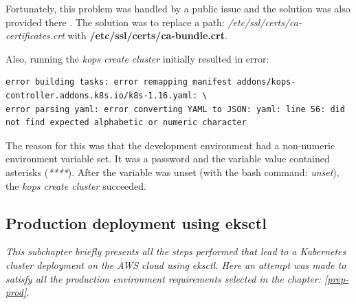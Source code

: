 Fortunately, this problem was handled by a public issue and the solution was also provided there \cite{as-github-issue}. The solution was to replace a path: \textit{/etc/ssl/certs/ca-certificates.crt} with \textbf{/etc/ssl/certs/ca-bundle.crt}.

Also, running the \textit{kops create cluster} initially resulted in error:
\begin{lstlisting}[caption={Error output of \textit{kops create cluster} command}]
error building tasks: error remapping manifest addons/kops-controller.addons.k8s.io/k8s-1.16.yaml: \
error parsing yaml: error converting YAML to JSON: yaml: line 56: did not find expected alphabetic or numeric character
\end{lstlisting}

The reason for this was that the development environment had a non-numeric environment variable set. It was a password and the variable value contained asterisks (\textit{****}). After the variable was unset (with the bash command: \textit{unset}), the \textit{kops create cluster} succeeded.


\subsection{Production deployment using eksctl}
\textit{This subchapter briefly presents all the steps performed that lead to a Kubernetes cluster deployment on the AWS cloud using eksctl. Here an attempt was made to satisfy all the production environment requirements selected in the chapter: \ref{prep-prod}.}
\\

